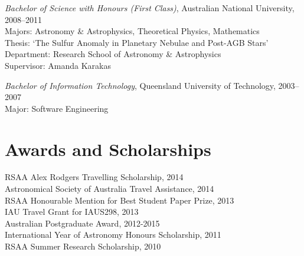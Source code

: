 \documentclass[11pt]{res} %
\begin{document}
\begin{resume}
	{\it Bachelor of Science with Honours (First Class)}, Australian National University, 2008--2011\\
	Majors: Astronomy \& Astrophysics, Theoretical Physics, Mathematics\\
	Thesis: `The Sulfur Anomaly in Planetary Nebulae and Post-AGB Stars'\\
	Department: Research School of Astronomy \& Astrophysics\\
	Supervisor: Amanda Karakas


	{\it Bachelor of Information Technology}, Queensland University of Technology, 2003--2007\\
	Major: Software Engineering

\section{Awards and Scholarships} 
	RSAA Alex Rodgers Travelling Scholarship, 2014\\
	Astronomical Society of Australia Travel Assistance, 2014\\
	RSAA Honourable Mention for Best Student Paper Prize, 2013\\
	IAU Travel Grant for IAUS298, 2013\\
	Australian Postgraduate Award, 2012-2015\\
	International Year of Astronomy Honours Scholarship, 2011\\
	RSAA Summer Research Scholarship, 2010


\end{resume}
\end{document}
